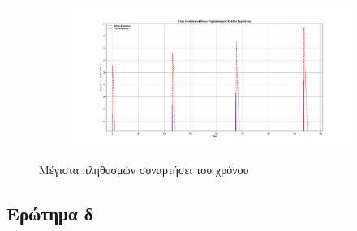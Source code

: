 \documentclass{article}
\begin{document}
\begin{figure}[H]
    \centering
	\begin{adjustbox}{center}
	
		\begin{subfigure}[c]{1.2\textwidth}    
			\includegraphics[width=1.2\textwidth,height=\textheight,keepaspectratio]{media/2/Figure_1.png}
		\end{subfigure}%

	\end{adjustbox}
\caption{Μέγιστα πληθυσμών συναρτήσει του χρόνου}
\label{(max)}
\end{figure}
\vspace*{\fill}
\subsection{Ερώτημα δ}
\end{document}
